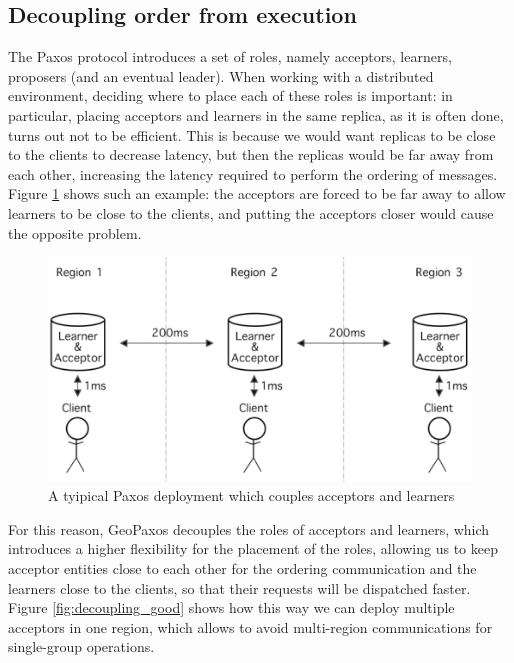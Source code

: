 \subsection{Decoupling order from execution}
The Paxos protocol introduces a set of roles, namely acceptors, learners, proposers (and an eventual leader). When working with a distributed environment, deciding where to place each of these roles is important: in particular, placing acceptors and learners in the same replica, as it is often done, turns out not to be efficient. This is because we would want replicas to be close to the clients to decrease latency, but then the replicas would be far away from each other, increasing the latency required to perform the ordering of messages. Figure \ref{fig:decoupling_bad} shows such an example: the acceptors are forced to be far away to allow learners to be close to the clients, and putting the acceptors closer would cause the opposite problem.
\begin{figure}[htb]
  \centering
  \includegraphics[width=\textwidth,height=\textheight,keepaspectratio]{img/decoupling_bad.png}
  \caption{A tyipical Paxos deployment which couples acceptors and learners}
  \label{fig:decoupling_bad}
\end{figure}

For this reason, GeoPaxos decouples the roles of acceptors and learners, which introduces a higher flexibility for the placement of the roles, allowing us to keep acceptor entities close to each other for the ordering communication and the learners close to the clients, so that their requests will be dispatched faster. Figure \ref{fig:decoupling_good} shows how this way we can deploy multiple acceptors in one region, which allows to avoid multi-region communications for single-group operations.

